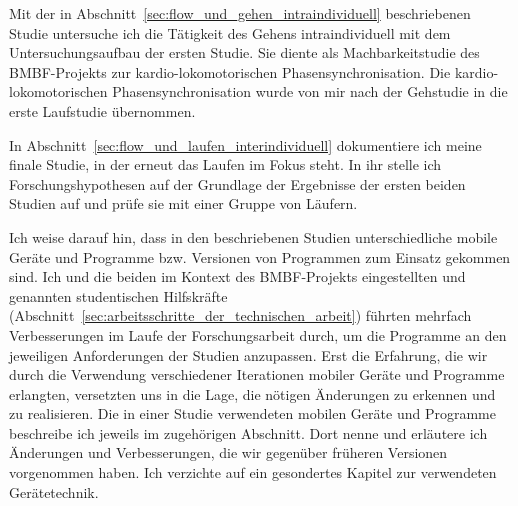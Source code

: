 Mit der in Abschnitt~\ref{sec:flow_und_gehen_intraindividuell} beschriebenen Studie untersuche ich die Tätigkeit des Gehens intraindividuell mit dem Untersuchungsaufbau der ersten Studie. Sie diente als Machbarkeitstudie des \acs{BMBF}-Projekts zur kardio-lokomotorischen Phasensynchronisation. Die kardio-lokomotorischen Phasensynchronisation wurde von mir nach der Gehstudie in die erste Laufstudie übernommen.    

In Abschnitt~\ref{sec:flow_und_laufen_interindividuell} dokumentiere ich meine finale Studie, in der erneut das Laufen im Fokus steht. In ihr stelle ich Forschungshypothesen auf der Grundlage der Ergebnisse der ersten beiden Studien auf und prüfe sie mit einer Gruppe von Läufern.

Ich weise darauf hin, dass in den beschriebenen Studien unterschiedliche mobile Geräte und Programme bzw. Versionen von Programmen zum Einsatz gekommen sind. Ich und die  beiden im Kontext des \acs{BMBF}-Projekts eingestellten und genannten studentischen Hilfskräfte (Abschnitt~\ref{sec:arbeitsschritte_der_technischen_arbeit}) führten mehrfach Verbesserungen im Laufe der Forschungsarbeit durch, um die Programme an den jeweiligen Anforderungen der Studien anzupassen. Erst die Erfahrung, die wir durch die Verwendung verschiedener Iterationen mobiler Geräte und Programme erlangten, versetzten uns in die Lage, die nötigen Änderungen zu erkennen und zu realisieren. Die in einer Studie verwendeten mobilen Geräte und Programme beschreibe ich jeweils im zugehörigen Abschnitt. Dort nenne und erläutere ich Änderungen und Verbesserungen, die wir gegenüber früheren Versionen vorgenommen haben. Ich verzichte auf ein gesondertes Kapitel zur verwendeten Gerätetechnik.